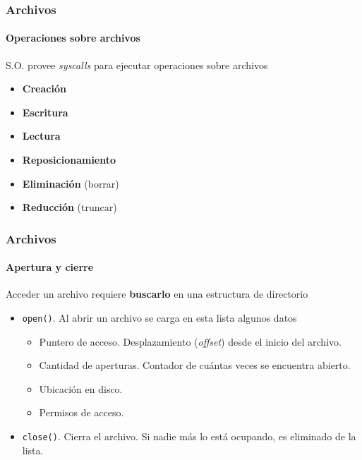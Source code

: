 \documentclass[letter]{beamer}
\begin{document}
\begin{frame}
  \frametitle{Archivos}
  \framesubtitle{Operaciones sobre archivos}

  S.O. provee {\em syscalls} para ejecutar operaciones sobre archivos
  
  \begin{itemize}
    \item {\bf Creación}
    \item {\bf Escritura}
    \item {\bf Lectura}
    \item {\bf Reposicionamiento}
    \item {\bf Eliminación} (borrar)
    \item {\bf Reducción} (truncar) 
  \end{itemize}
  
\end{frame}

\begin{frame}
  \frametitle{Archivos}
  \framesubtitle{Apertura y cierre}

  Acceder un archivo requiere {\bf buscarlo} en una estructura de directorio
  
  
  \begin{itemize}
    \item<3-> {\tt open()}. Al abrir un archivo se carga en esta lista algunos datos
      \begin{itemize}
        \item Puntero de acceso. Desplazamiento ({\em offset}) desde el inicio del archivo.
        \item Cantidad de aperturas. Contador de cuántas veces se encuentra abierto.
        \item Ubicación en disco.
        \item Permisos de acceso.
      \end{itemize}
    \item<4-> {\tt close()}. Cierra el archivo. Si nadie más lo está ocupando, es eliminado
              de la lista.
  \end{itemize}
\end{frame}
\end{document}

